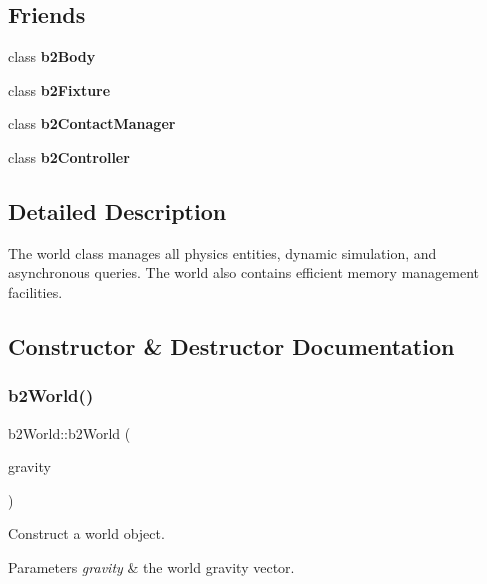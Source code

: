 \subsection*{Friends}
\begin{DoxyCompactItemize}
\item 
\mbox{\label{classb2_world_a010ab52de250e5fe30a45d642f46405b}} 
class {\bfseries b2\+Body}
\item 
\mbox{\label{classb2_world_afb35b0e61f6ee3cc516c40ea251f3236}} 
class {\bfseries b2\+Fixture}
\item 
\mbox{\label{classb2_world_aece264d42f69aed410f5eb3beba6ddf2}} 
class {\bfseries b2\+Contact\+Manager}
\item 
\mbox{\label{classb2_world_ad0171f9dac44cc7aae065c618c0d165b}} 
class {\bfseries b2\+Controller}
\end{DoxyCompactItemize}


\subsection{Detailed Description}
The world class manages all physics entities, dynamic simulation, and asynchronous queries. The world also contains efficient memory management facilities. 

\subsection{Constructor \& Destructor Documentation}
\mbox{\label{classb2_world_aeccc87fd9e36702c821a8244ca7cd875}} 
\subsubsection{\texorpdfstring{b2\+World()}{b2World()}}
{\footnotesize\ttfamily b2\+World\+::b2\+World (\begin{DoxyParamCaption}\item[{const \hyperlink{structb2_vec2}{b2\+Vec2} \&}]{gravity }\end{DoxyParamCaption})}

Construct a world object. 
\begin{DoxyParams}{Parameters}
{\em gravity} & the world gravity vector. \\
\hline
\end{DoxyParams}



